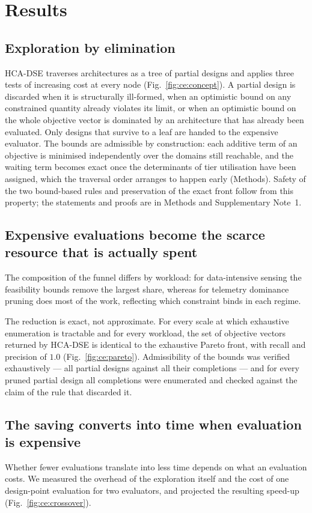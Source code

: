\section*{Results}
\label{sec:ce:results}

\subsection*{Exploration by elimination}
HCA-DSE traverses architectures as a tree of partial designs and applies three tests of
increasing cost at every node (Fig.~\ref{fig:ce:concept}). A partial design is discarded
when it is structurally ill-formed, when an optimistic bound on any constrained quantity
already violates its limit, or when an optimistic bound on the whole objective vector is
dominated by an architecture that has already been evaluated. Only designs that survive
to a leaf are handed to the expensive evaluator. The bounds are admissible by
construction: each additive term of an objective is minimised independently over the
domains still reachable, and the waiting term becomes exact once the determinants of tier
utilisation have been assigned, which the traversal order arranges to happen early
(Methods). Safety of the two bound-based rules and preservation of the exact front follow
from this property; the statements and proofs are in Methods and Supplementary Note~1.

\subsection*{Expensive evaluations become the scarce resource that is actually spent}

The composition of the funnel differs by workload: for data-intensive sensing the
feasibility bounds remove the largest share, whereas for telemetry dominance pruning does
most of the work, reflecting which constraint binds in each regime.

The reduction is exact, not approximate. For every scale at which exhaustive enumeration
is tractable and for every workload, the set of objective vectors returned by HCA-DSE is
identical to the exhaustive Pareto front, with recall and precision of $1.0$
(Fig.~\ref{fig:ce:pareto}). Admissibility of the bounds was verified exhaustively --- all
partial designs against all their completions --- and for every pruned partial design all
completions were enumerated and checked against the claim of the rule that discarded it.


\subsection*{The saving converts into time when evaluation is expensive}
Whether fewer evaluations translate into less time depends on what an evaluation costs.
We measured the overhead of the exploration itself and the cost of one design-point
evaluation for two evaluators, and projected the resulting speed-up
(Fig.~\ref{fig:ce:crossover}).


